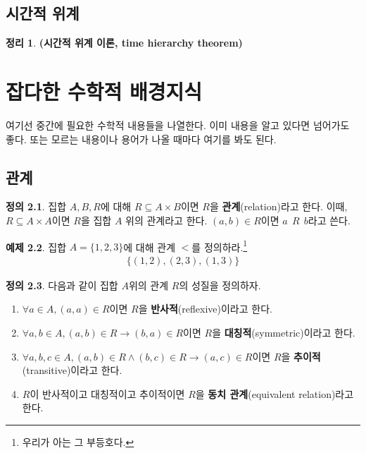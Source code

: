 \documentclass[b5paper, 11pt]{book}
\theoremstyle{definition}
\newtheorem{defn}{정의}[chapter]
\newtheorem{thm}[defn]{정리}
\newtheorem{ex}[defn]{예제}
\newenvironment{pf*}{\pushQED{\qed}\pf}
{\popQED\endpf}
\begin{document}
\section{시간적 위계}
\begin{thm}
    \textbf{(시간적 위계 이론, time hierarchy theorem)}
\end{thm}
\begin{pf*}
    
\end{pf*}
\appendix
\chapter{잡다한 수학적 배경지식}
여기선 중간에 필요한 수학적 내용들을 나열한다. 
이미 내용을 알고 있다면 넘어가도 좋다. 또는 모르는 내용이나 용어가 나올 때마다 여기를 
봐도 된다.
\section{관계}
\begin{defn}
    집합 $A, B, R$에 대해 $R \subseteq A \times B$이면 $R$을 \textbf{관계}(relation)라고 한다.
    이때, $R \subseteq A \times A$이면 $R$을 집합 $A$ 위의 관계라고 한다. 
    $(a, b) \in R$이면 $a \;\, R \;\, b$라고 쓴다.
\end{defn}
\begin{ex}
    집합 $A = \{1, 2, 3\}$에 대해 관계 $<$를 정의하라.\footnote{우리가 아는 그 부등호다.}
    \begin{align*}
        \{(1, 2), (2, 3), (1, 3)\}
    \end{align*}
\end{ex}
\begin{defn}
    다음과 같이 집합 $A$위의 관계 $R$의 성질을 정의하자.
    \begin{enumerate}
        \item $\forall a \in A, (a, a) \in R$이면 $R$을 \textbf{반사적}(reflexive)이라고 한다.
        \item $\forall a, b \in A, (a, b) \in R \rightarrow (b, a) \in R$이면
        $R$을 \textbf{대칭적}(symmetric)이라고 한다.
        \item $\forall a, b, c\in A, (a, b) \in R \wedge (b, c) \in R \rightarrow 
        (a, c) \in R$이면 $R$을 \textbf{추이적}(transitive)이라고 한다.
        \item $R$이 반사적이고 대칭적이고 추이적이면 $R$을 \textbf{동치 관계}(equivalent relation)라고
        한다.
    \end{enumerate}
\end{defn}
\end{document}
